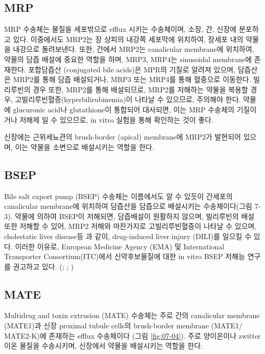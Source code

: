 \documentclass[
  11pt,
  krantz2, a4paper, twoside]{krantz}
\begin{document}
\subsection{MRP}\label{mrp}

MRP 수송체는 물질을 세포밖으로 efflux 시키는 수송체이며, 소장, 간,
신장에 분포하고 있다. 이중에서도 MRP2는 장 상피의 내강쪽 세포막에
위치하여, 장세포 내의 약물을 내강으로 돌려보낸다. 또한, 간에서 MRP2는
canalicular membrane에 위치하여, 약물의 담즙 배설에 중요한 역할을 하며,
MRP3, MRP4는 sinusoidal membrane에 존재한다. 포합담즙산 (conjugated bile
acids)은 MPR의 기질로 알려져 있으며, 담즙산은 MRP2를 통해 담즙
배설되거나, MRP3 또는 MRP4를 통해 혈중으로 이동한다. 빌리루빈의 경우
또한, MRP2를 통해 배설되므로, MRP2를 저해하는 약물을 복용할 경우,
고빌리루빈혈증(hyperbilirubinemia)이 나타날 수 있으므로, 주의해야 한다.
약물에 glucuronic acid나 glutathione이 통합되어 대사되면, 이는 MRP
수송체의 기질이거나 저해제 일 수 있으므로, in vitro 실험을 통해 확인하는
것이 좋다.

신장에는 근위세뇨관의 brush-border (apical) membrane에 MRP2가 발현되어
있으며, 이는 약물을 소변으로 배설시키는 역할을 한다.

\subsection{BSEP}\label{bsep}

Bile salt export pump (BSEP) 수송체는 이름에서도 알 수 있듯이 간세포의
canalicular membrane에 위치하여 담즙산을 담즙으로 배설시키는
수송체이다(그림 7-3). 약물에 의하여 BSEP이 저해되면, 담즙배설이 원활하지
않으며, 빌리루빈의 배설 또한 저해할 수 있어, MRP2 저해와 마찬가지로
고빌리루빈혈증이 나타날 수 있으며, cholestatic liver disease등 과 같이,
drug-induced liver injury (DILI)를 일으킬 수 있다. 이러한 이유로,
European Medicine Agency (EMA) 및 International Transporter
Consortium(ITC)에서 신약후보물질에 대한 in vitro BSEP 저해능 연구를
권고하고 있다. (; ; )

\subsection{MATE}\label{mate}

Multidrug and toxin extrusion (MATE) 수송체는 주로 간의 canalicular
membrane (MATE1)과 신장 proximal tubule cells의 brush-border membrane
(MATE1/ MATE2-K)에 존재하는 efflux 수송체이다 (그림 \ref{fig:07-04}).
주로 양이온이나 zwitter 이온 물질을 수송시키며, 신장에서 약물을
배설시키는 역할을 한다.
\end{document}
